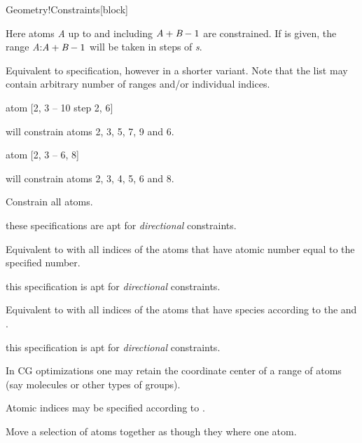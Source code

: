 \begin{fdfentry}{Geometry!Constraints}[block]
\begin{fdfoptions}
\begin{fdfoptions}
      Here atoms \emph{A} up to and including $\emph{A}+\emph{B}-1$
      are constrained.  
      If  is given, the range
      \emph{A}:$\emph{A}+\emph{B}-1$ will be taken in steps of
      \emph{s}.

      Equivalent to  specification, however in a
      shorter variant. Note that the list may contain arbitrary number
      of ranges and/or individual indices.

      \begin{fdfexample}
        atom [2, 3 -- 10 step 2, 6]
      \end{fdfexample}
      will constrain atoms 2, 3, 5, 7, 9 and 6.

      \begin{fdfexample}
        atom [2, 3 -- 6, 8]
      \end{fdfexample}
      will constrain atoms 2, 3, 4, 5, 6 and 8.

      Constrain all atoms. 
      
    \end{fdfoptions}

    \note these specifications are apt for \emph{directional}
    constraints. 

    \option[Z]%
    Equivalent to  with all indices of the atoms that
    have atomic number equal to the specified number.

    \note this specification is apt for \emph{directional}
    constraints. 

    \option[species-i]%
    Equivalent to  with all indices of the atoms that
    have species according to the  and
    .

    \note this specification is apt for \emph{directional}
    constraints. 


    \option[center]%
    In CG optimizations one may retain the coordinate center of a
    range of atoms (say molecules or other types of groups).

    Atomic indices may be specified according to .


    Move a selection of atoms together as though they where one atom.


\end{fdfoptions}
\end{fdfentry}
